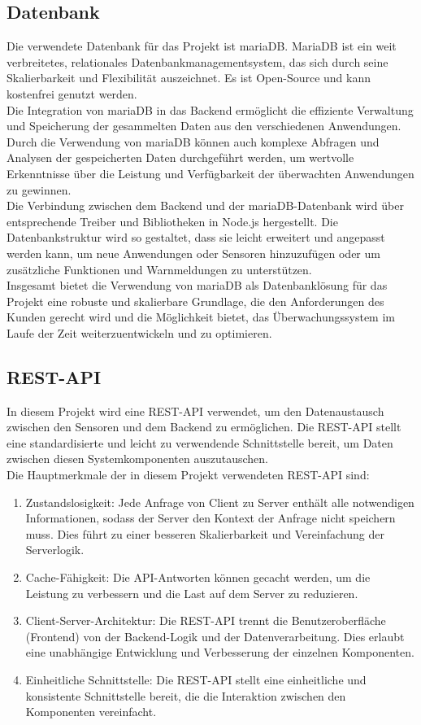 \begin{flushleft}
	\subsection{Datenbank}
	Die verwendete Datenbank für das Projekt ist mariaDB. MariaDB ist ein weit verbreitetes, relationales Datenbankmanagementsystem, das sich durch seine Skalierbarkeit und Flexibilität auszeichnet. Es ist Open-Source und kann kostenfrei genutzt werden.\\
	Die Integration von mariaDB in das Backend ermöglicht die effiziente Verwaltung und Speicherung der gesammelten Daten aus den verschiedenen Anwendungen. Durch die Verwendung von mariaDB können auch komplexe Abfragen und Analysen der gespeicherten Daten durchgeführt werden, um wertvolle Erkenntnisse über die Leistung und Verfügbarkeit der überwachten Anwendungen zu gewinnen.\\
	Die Verbindung zwischen dem Backend und der mariaDB-Datenbank wird über entsprechende Treiber und Bibliotheken in Node.js hergestellt. Die Datenbankstruktur wird so gestaltet, dass sie leicht erweitert und angepasst werden kann, um neue Anwendungen oder Sensoren hinzuzufügen oder um zusätzliche Funktionen und Warnmeldungen zu unterstützen.\\
	Insgesamt bietet die Verwendung von mariaDB als Datenbanklösung für das Projekt eine robuste und skalierbare Grundlage, die den Anforderungen des Kunden gerecht wird und die Möglichkeit bietet, das Überwachungssystem im Laufe der Zeit weiterzuentwickeln und zu optimieren.\\


	\subsection{REST-API}
	In diesem Projekt wird eine REST-API verwendet, um den Datenaustausch zwischen den Sensoren und dem Backend zu ermöglichen. Die REST-API stellt eine standardisierte und leicht zu verwendende Schnittstelle bereit, um Daten zwischen diesen Systemkomponenten auszutauschen.
	\\
	Die Hauptmerkmale der in diesem Projekt verwendeten REST-API sind:
	\begin{enumerate}
	\item Zustandslosigkeit: Jede Anfrage von Client zu Server enthält alle notwendigen Informationen, sodass der Server den Kontext der Anfrage nicht speichern muss. Dies führt zu einer besseren Skalierbarkeit und Vereinfachung der Serverlogik.
	\item Cache-Fähigkeit: Die API-Antworten können gecacht werden, um die Leistung zu verbessern und die Last auf dem Server zu reduzieren.
	\item Client-Server-Architektur: Die REST-API trennt die Benutzeroberfläche (Frontend) von der Backend-Logik und der Datenverarbeitung. Dies erlaubt eine unabhängige Entwicklung und Verbesserung der einzelnen Komponenten.
	\item Einheitliche Schnittstelle: Die REST-API stellt eine einheitliche und konsistente Schnittstelle bereit, die die Interaktion zwischen den Komponenten vereinfacht.
	\end{enumerate}


\end{flushleft}
